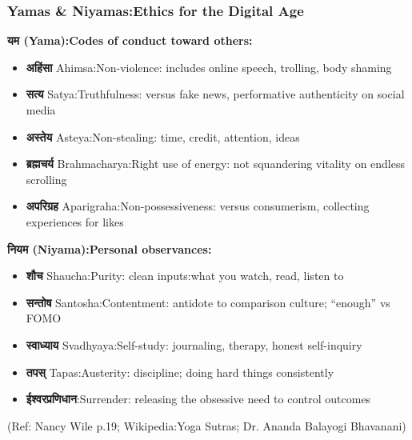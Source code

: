 \begin{frame}[fragile]\frametitle{Yamas \& Niyamas:Ethics for the Digital Age}

\textbf{यम (Yama):Codes of conduct toward others:}
\begin{itemize}
\item \textbf{अहिंसा} Ahimsa:Non-violence: includes online speech, trolling, body shaming
\item \textbf{सत्य} Satya:Truthfulness: versus fake news, performative authenticity on social media
\item \textbf{अस्तेय} Asteya:Non-stealing: time, credit, attention, ideas
\item \textbf{ब्रह्मचर्य} Brahmacharya:Right use of energy: not squandering vitality on endless scrolling
\item \textbf{अपरिग्रह} Aparigraha:Non-possessiveness: versus consumerism, collecting experiences for likes
\end{itemize}

\textbf{नियम (Niyama):Personal observances:}
\begin{itemize}
\item \textbf{शौच} Shaucha:Purity: clean inputs:what you watch, read, listen to
\item \textbf{सन्तोष} Santosha:Contentment: antidote to comparison culture; ``enough'' vs FOMO
\item \textbf{स्वाध्याय} Svadhyaya:Self-study: journaling, therapy, honest self-inquiry
\item \textbf{तपस्} Tapas:Austerity: discipline; doing hard things consistently
\item \textbf{ईश्वरप्रणिधान}:Surrender: releasing the obsessive need to control outcomes
\end{itemize}

\tiny{(Ref: Nancy Wile p.19; Wikipedia:Yoga Sutras; Dr. Ananda Balayogi Bhavanani)}

\end{frame}

